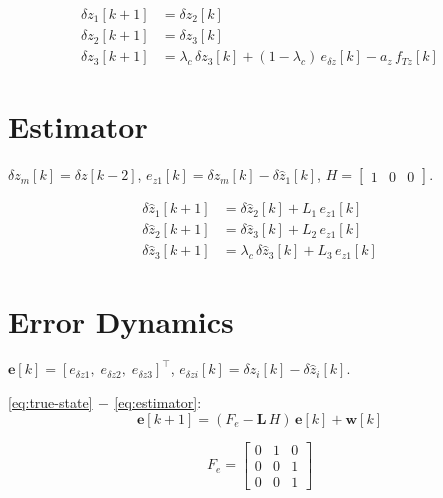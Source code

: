 \documentclass[11pt,a4paper]{article}
\newcommand{\dz}{\delta z}
\newcommand{\dzhat}[1]{\delta\hat{z}_{#1}}
\newcommand{\edz}{e_{\delta z}}
\newcommand{\fTz}{f_{Tz}}
\newcommand{\az}{a_z}
\newcommand{\lc}{\lambda_c}
\begin{document}
\begin{equation}
  \boxed{\;
  \begin{aligned}
    \dz_1[k\!+\!1] &= \dz_2[k] \\
    \dz_2[k\!+\!1] &= \dz_3[k] \\
    \dz_3[k\!+\!1] &= \lc\,\dz_3[k]
      + (1\!-\!\lc)\,\edz[k]
      - \az\,\fTz[k]
  \end{aligned}
  \;}
  \label{eq:true-state}
\end{equation}

\section{Estimator}

$\dz_m[k]=\dz[k\!-\!2]$,\quad
$e_{z1}[k]=\dz_m[k]-\dzhat{1}[k]$,\quad
$H=\begin{bmatrix}1&0&0\end{bmatrix}$.

\begin{equation}
  \boxed{\;
  \begin{aligned}
    \dzhat{1}[k\!+\!1]
      &= \dzhat{2}[k] + L_1\,e_{z1}[k] \\
    \dzhat{2}[k\!+\!1]
      &= \dzhat{3}[k] + L_2\,e_{z1}[k] \\
    \dzhat{3}[k\!+\!1]
      &= \lc\,\dzhat{3}[k] + L_3\,e_{z1}[k]
  \end{aligned}
  \;}
  \label{eq:estimator}
\end{equation}

\section{Error Dynamics}

$\bm{e}[k]=[e_{\dz 1},\;e_{\dz 2},\;e_{\dz 3}]^\top$,\quad
$e_{\dz i}[k]=\dz_i[k]-\dzhat{i}[k]$.

\eqref{eq:true-state}$\,-\,$\eqref{eq:estimator}:
\begin{equation}
  \bm{e}[k\!+\!1]
  = (F_e - \bm{L}\,H)\,\bm{e}[k] + \bm{w}[k]
  \label{eq:error-dyn-obs}
\end{equation}

\begin{equation}
  F_e =
  \begin{bmatrix}0&1&0\\0&0&1\\0&0&1\end{bmatrix}
  \label{eq:Fe}
\end{equation}
\end{document}
